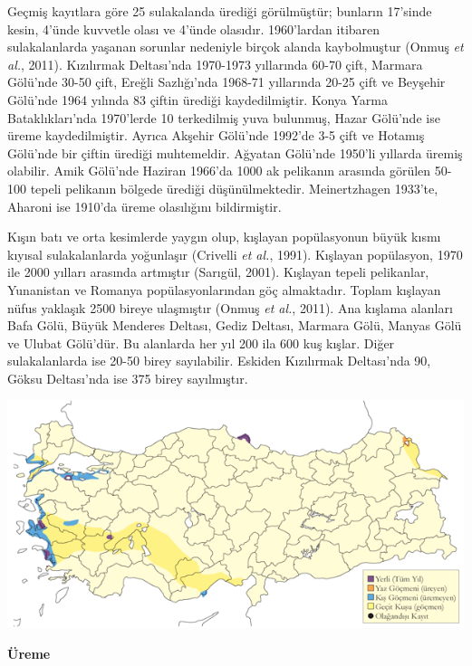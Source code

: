 \documentclass[
  a4paper,
  DIV=11,
  numbers=noendperiod]{scrreprt}
\begin{document}
Geçmiş kayıtlara göre 25 sulakalanda ürediği görülmüştür; bunların
17'sinde kesin, 4'ünde kuvvetle olası ve 4'ünde olasıdır. 1960'lardan
itibaren sulakalanlarda yaşanan sorunlar nedeniyle birçok alanda
kaybolmuştur (Onmuş \emph{et al.}, 2011). Kızılırmak Deltası'nda
1970-1973 yıllarında 60-70 çift, Marmara Gölü'nde 30-50 çift, Ereğli
Sazlığı'nda 1968-71 yıllarında 20-25 çift ve Beyşehir Gölü'nde 1964
yılında 83 çiftin ürediği kaydedilmiştir. Konya Yarma Bataklıkları'nda
1970'lerde 10 terkedilmiş yuva bulunmuş, Hazar Gölü'nde ise üreme
kaydedilmiştir. Ayrıca Akşehir Gölü'nde 1992'de 3-5 çift ve Hotamış
Gölü'nde bir çiftin ürediği muhtemeldir. Ağyatan Gölü'nde 1950'li
yıllarda üremiş olabilir. Amik Gölü'nde Haziran 1966'da 1000 ak
pelikanın arasında görülen 50-100 tepeli pelikanın bölgede ürediği
düşünülmektedir. Meinertzhagen 1933'te, Aharoni ise 1910'da üreme
olasılığını bildirmiştir.

Kışın batı ve orta kesimlerde yaygın olup, kışlayan popülasyonun büyük
kısmı kıyısal sulakalanlarda yoğunlaşır (Crivelli \emph{et al.}, 1991).
Kışlayan popülasyon, 1970 ile 2000 yılları arasında artmıştır (Sarıgül,
2001). Kışlayan tepeli pelikanlar, Yunanistan ve Romanya
popülasyonlarından göç almaktadır. Toplam kışlayan nüfus yaklaşık 2500
bireye ulaşmıştır (Onmuş \emph{et al.}, 2011). Ana kışlama alanları Bafa
Gölü, Büyük Menderes Deltası, Gediz Deltası, Marmara Gölü, Manyas Gölü
ve Ulubat Gölü'dür. Bu alanlarda her yıl 200 ila 600 kuş kışlar. Diğer
sulakalanlarda ise 20-50 birey sayılabilir. Eskiden Kızılırmak
Deltası'nda 90, Göksu Deltası'nda ise 375 birey sayılmıştır.

\includegraphics{images/harita_Page_075.png}

\textbf{Üreme}
\end{document}

